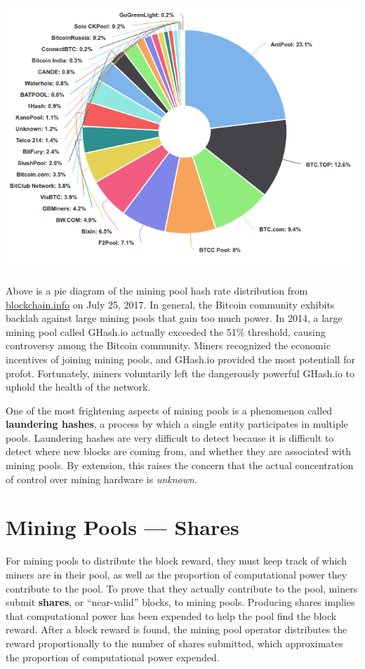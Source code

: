 \documentclass[full.tex]{subfiles}
\begin{document}
    \begin{center}
        \includegraphics[scale=0.5]{hash_rate_distribution}
    \end{center}
    
    Above is a pie diagram of the mining pool hash rate distribution from \underline{blockchain.info} on July 25, 2017. In general, the Bitcoin community exhibits backlah against large mining pools that gain too much power. In 2014, a large mining pool called GHash.io actually exceeded the 51\% threshold, causing controversy among the Bitcoin community. Miners recognized the economic incentives of joining mining pools, and GHash.io provided the most potentiall for profot. Fortunately, miners voluntarily left the dangerously powerful GHash.io to uphold the health of the network.
    
    One of the most frightening aspects of mining pools is a phenomenon called \textbf{laundering hashes}, a process by which a single entity participates in multiple pools. Laundering hashes are very difficult to detect because it is difficult to detect where new blocks are coming from, and whether they are associated with mining pools. By extension, this raises the concern that the actual concentration of control over mining hardware is \textit{unknown}.
    
    \section*{Mining Pools --- Shares}
    
    For mining pools to distribute the block reward, they must keep track of which miners are in their pool, as well as the proportion of computational power they contribute to the pool. To prove that they actually contribute to the pool, miners submit \textbf{shares}, or ``near-valid'' blocks, to mining pools. Producing shares implies that computational power has been expended to help the pool find the block reward. After a block reward is found, the mining pool operator distributes the reward proportionally to the number of shares submitted, which approximates the proportion of computational power expended.
    
\end{document}

